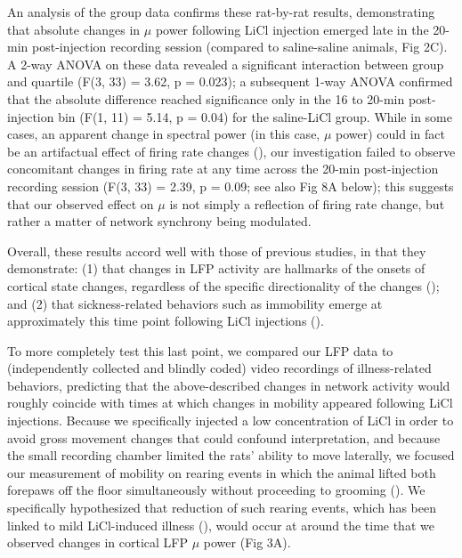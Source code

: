\begin{refsection}
{An analysis of the group data confirms these rat-by-rat results, demonstrating that absolute changes in \(\mu\) power following LiCl injection emerged late in the 20-min post-injection recording session (compared to saline-saline animals, Fig 2C). A 2-way ANOVA on these data revealed a significant interaction between group and quartile (F(3, 33) = 3.62, p = 0.023); a subsequent 1-way ANOVA confirmed that the absolute difference reached significance only in the 16 to 20-min post-injection bin (F(1, 11) = 5.14, p = 0.04) for the saline-LiCl group. While in some cases, an apparent change in spectral power (in this case, \(\mu\) power) could in fact be an artifactual effect of firing rate changes (\cite{waldert2013a}), our investigation failed to observe concomitant changes in firing rate at any time across the 20-min post-injection recording session (F(3, 33) = 2.39, p = 0.09; see also Fig 8A below); this suggests that our observed effect on \(\mu\) is not simply a reflection of firing rate change, but rather a matter of network synchrony being modulated.

Overall, these results accord well with those of previous studies, in that they demonstrate: (1) that changes in LFP activity are hallmarks of the onsets of cortical state changes, regardless of the specific directionality of the changes (\cite{pachitariu2015a,zhou2014a,tan2014a,zucca2019a}); and (2) that sickness-related behaviors such as immobility emerge at approximately this time point following LiCl injections (\cite{nachman1975a,cross-mellor2009a,parker2004a,tomasiewicz2006a,l2019a,smith1978a}).

To more completely test this last point, we compared our LFP data to (independently collected and blindly coded) video recordings of illness-related behaviors, predicting that the above-described changes in network activity would roughly coincide with times at which changes in mobility appeared following LiCl injections. Because we specifically injected a low concentration of LiCl in order to avoid gross movement changes that could confound interpretation, and because the small recording chamber limited the rats’ ability to move laterally, we focused our measurement of mobility on rearing events in which the animal lifted both forepaws off the floor simultaneously without proceeding to grooming (\cite{grill1978a,grill1978b}). We specifically hypothesized that reduction of such rearing events, which has been linked to mild LiCl-induced illness (\cite{smith1978a}), would occur at around the time that we observed changes in cortical LFP \(\mu\) power (Fig 3A).

}
\end{refsection}
